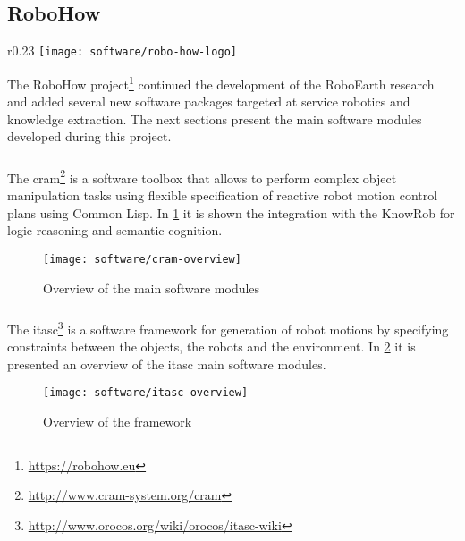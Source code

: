 \subsection{RoboHow}

\begin{wrapfigure}{r}{0.23\textwidth}
	\centering
	\vspace*{-2em}
	\texttt{[image: software/robo-how-logo]}
	\caption{RoboHow logo}
	\label{fig:robo-how-logo}
\end{wrapfigure}

The RoboHow project\footnote{\url{https://robohow.eu}} continued the development of the RoboEarth research and added several new software packages targeted at service robotics and knowledge extraction. The next sections present the main software modules developed during this project.

\subsubsection{}

The \gls{cram}\footnote{\url{http://www.cram-system.org/cram}} \cite{Beetz2010} is a software toolbox that allows to perform complex object manipulation tasks using flexible specification of reactive robot motion control plans using Common Lisp. In \cref{fig:cram-overview} it is shown the integration with the KnowRob for logic reasoning and semantic cognition.

\begin{figure}[H]
	\centering
	\texttt{[image: software/cram-overview]}
	\caption{Overview of the  main software modules}
	\label{fig:cram-overview}
\end{figure}


\subsubsection{}

The \gls{itasc}\footnote{\url{http://www.orocos.org/wiki/orocos/itasc-wiki}} \cite{DeSchutter-ijrr2007} is a software framework for generation of robot motions by specifying constraints between the objects, the robots and the environment. In \cref{fig:itasc-overview} it is presented an overview of the \gls{itasc} main software modules.

\begin{figure}[H]
	\centering
	\texttt{[image: software/itasc-overview]}
	\caption[Overview of the  framework]{Overview of the  framework\protect\footnotemark}
	\label{fig:itasc-overview}
\end{figure}



